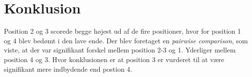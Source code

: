 \section*{Konklusion}
\label{Conlusion}

Position 2 og 3 scorede begge højest ud af de fire positioner, hvor for position 1 og 4 blev bedømt i den lave ende. Der blev foretaget en \textit{pairwise comparison}, som viste, at der var signifikant forskel mellem position 2-3 og 1. Yderliger mellem position 4 og 3. Hvor konklusionen er at position 3 er vurderet til at være signifikant mere indbydende end postion 4.